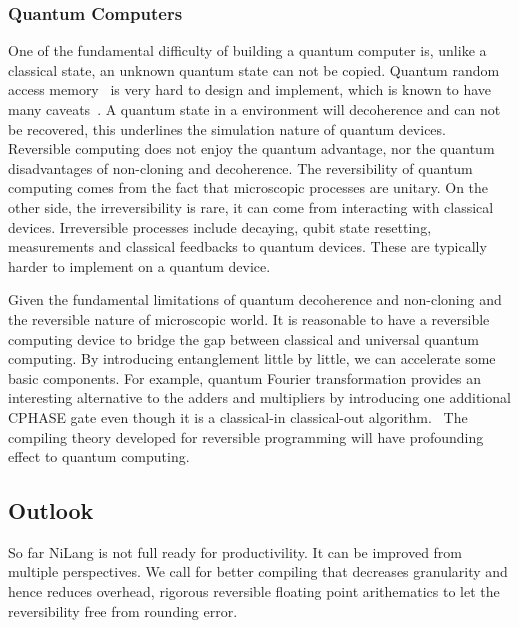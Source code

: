 \documentclass[aps,twocolumn,longbibliography,english,superscriptaddress]{revtex4-1}
\newcommand{\<}{\langle}
\renewcommand{\>}{\rangle}
\theoremstyle{definition}\newtheorem{definition}{\textit{Definition}}
\begin{document}
\subsubsection{Quantum Computers}\label{sec:qc}
One of the fundamental difficulty of building a quantum computer is, unlike a classical state, an unknown quantum state can not be copied.
Quantum random access memory~\cite{Giovannetti2008} is very hard to design and implement, which is known to have many caveats~\cite{Aaronson2015}.
A quantum state in a environment will decoherence and can not be recovered, this underlines the simulation nature of quantum devices.
Reversible computing does not enjoy the quantum advantage, nor the quantum disadvantages of non-cloning and decoherence.
The reversibility of quantum computing comes from the fact that microscopic processes are unitary.
On the other side, the irreversibility is rare, it can come from interacting with classical devices. Irreversible processes include decaying, qubit state resetting, measurements and classical feedbacks to quantum devices. These are typically harder to implement on a quantum device.

Given the fundamental limitations of quantum decoherence and non-cloning and the reversible nature of microscopic world.
It is reasonable to have a reversible computing device to bridge the gap between classical and universal quantum computing.
By introducing entanglement little by little, we can accelerate some basic components. For example, quantum Fourier transformation provides an interesting alternative to the adders and multipliers by introducing one additional CPHASE gate even though it is a classical-in classical-out algorithm.~\cite{RuizPerez2017}
The compiling theory developed for reversible programming will have profounding effect to quantum computing.

\subsection{Outlook}\label{sec:outlook}
So far NiLang is not full ready for productivility. It can be improved from multiple perspectives. We call for better compiling that decreases granularity and hence reduces overhead, rigorous reversible floating point arithematics to let the reversibility free from rounding error.
\end{document}
